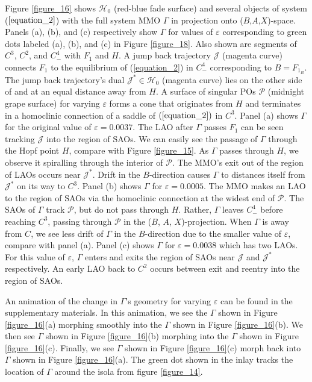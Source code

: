 \documentclass{ws-ijbc}
\begin{document}
Figure \ref{figure_16} shows $\mathscr{H}_0$ (red-blue fade surface) and several objects of system ($\ref{equation_2}$) with the full system MMO $\Gamma$ in projection onto ($B$,$A$,$X$)-space.  Panels (a), (b), and (c) respectively show $\Gamma$ for values of $\varepsilon$ corresponding to green dots labeled (a), (b), and (c) in Figure \ref{figure_18}.  Also shown are segments of $C^3$, $C^2$, and $C^4_-$ with $F_1$ and $H$.  A jump back trajectory $\mathscr{J}$ (magenta curve) connects $F_1$ to the equilibrium of (\ref{equation_2}) in $C^4_-$ corresponding to $B=F_{1_B}$.  The jump back trajectory's dual $\mathscr{J}^* \in \mathscr{H}_0$ (magenta curve) lies on the other side of and at an equal distance away from $H$.  A surface of singular POs $\mathscr{P}$ (midnight grape surface) for varying $\varepsilon$ forms a cone that originates from $H$ and terminates in a homoclinic connection of a saddle of $(\ref{equation_2})$ in $C^3$.  Panel (a) shows $\Gamma$ for the original value of $\varepsilon=0.0037$.  The LAO after $\Gamma$ passes $F_1$ can be seen tracking $\mathscr{J}$ into the region of SAOs.  We can easily see the passage of $\Gamma$ through the Hopf point $H$, compare with Figure \ref{figure_15}.  As $\Gamma$ passes through $H$, we observe it spiralling through the interior of $\mathscr{P}$.  The MMO's exit out of the region of LAOs occurs near $\mathscr{J}^*$. Drift in the $B$-direction causes $\Gamma$ to distances itself from $\mathscr{J}^*$ on its way to $C^3$.  Panel (b) shows $\Gamma$ for $\varepsilon=0.0005$.  The MMO makes an LAO to the region of SAOs via the homoclinic connection at the widest end of $\mathscr{P}$.  The SAOs of $\Gamma$ track $\mathscr{P}$, but do not pass through $H$.  Rather, $\Gamma$ leaves $C^4_-$ before reaching $C^3$, passing through $\mathscr{P}$ in the ($B$, $A$, $X$)-projection.  When $\Gamma$ is away from $C$, we see less drift of $\Gamma$ in the $B$-direction due to the smaller value of $\varepsilon$, compare with panel (a).  Panel (c) shows $\Gamma$ for $\varepsilon=0.0038$ which has two LAOs.  For this value of $\varepsilon$, $\Gamma$ enters and exits the region of SAOs near $\mathscr{J}$ and $\mathscr{J}^*$ respectively.  An early LAO back to $C^2$ occurs between exit and reentry into the region of SAOs.

An animation of the change in $\Gamma$'s geometry for varying $\varepsilon$ can be found in the supplementary materials.  In this animation, we see the $\Gamma$ shown in Figure \ref{figure_16}(a) morphing smoothly into the $\Gamma$ shown in Figure \ref{figure_16}(b).  We then see $\Gamma$ shown in Figure \ref{figure_16}(b) morphing into the $\Gamma$ shown in Figure \ref{figure_16}(c).  Finally, we see $\Gamma$ shown in Figure \ref{figure_16}(c) morph back into $\Gamma$ shown in Figure \ref{figure_16}(a).  The green dot shown in the inlay tracks the location of $\Gamma$ around the isola from figure \ref{figure_14}.

\newpage

\end{document}

